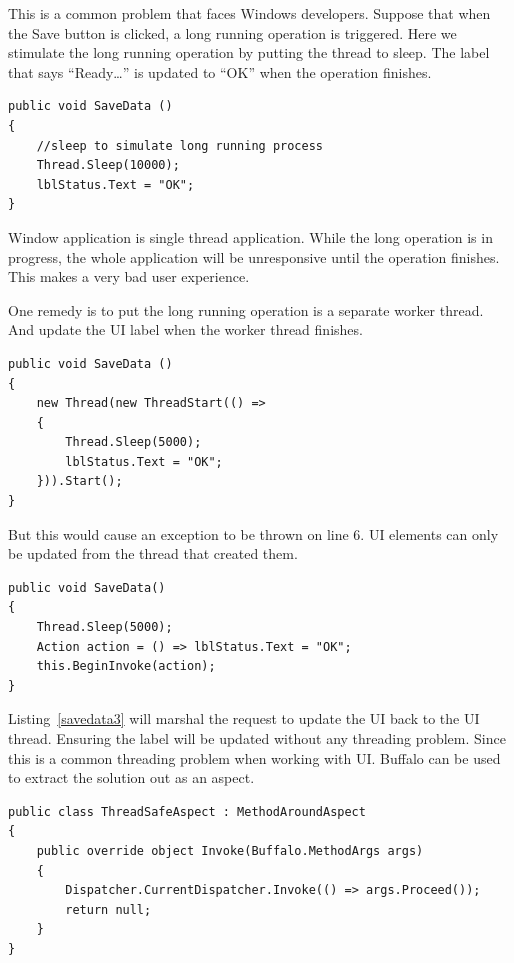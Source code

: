 This is a common problem that faces Windows developers. Suppose that when the Save button is clicked, a long running operation is triggered. Here we stimulate the long running operation by putting the thread to sleep. The label that says “Ready…” is updated to “OK” when the operation finishes.

\begin{lstlisting}[caption={Long running operation}, label=savedata1, frame=tb, basicstyle=\scriptsize]
public void SaveData ()
{
    //sleep to simulate long running process
    Thread.Sleep(10000);
    lblStatus.Text = "OK";
}
\end{lstlisting}

Window application is single thread application. While the long operation is in progress, the whole application will be unresponsive until the operation finishes. This makes a very bad user experience.

One remedy is to put the long running operation is a separate worker thread. And update the UI label when the worker thread finishes.

\begin{lstlisting}[caption={Long running operation with thread}, label=savedata2, frame=tb, basicstyle=\scriptsize]
public void SaveData ()
{
    new Thread(new ThreadStart(() =>
    {
        Thread.Sleep(5000);
        lblStatus.Text = "OK";
    })).Start();
}
\end{lstlisting}

But this would cause an exception to be thrown on line 6. UI elements can only be updated from the thread that created them.

\begin{lstlisting}[caption={Update UI from different thread}, label=savedata3, frame=tb, basicstyle=\scriptsize]
public void SaveData()
{ 
    Thread.Sleep(5000);
    Action action = () => lblStatus.Text = "OK";
    this.BeginInvoke(action);
}
\end{lstlisting}

Listing~\ref{savedata3} will marshal the request to update the UI back to the UI thread. Ensuring the label will be updated without any threading problem.
Since this is a common threading problem when working with UI. Buffalo can be used to extract the solution out as an aspect.

\begin{lstlisting}[caption={ThreadSafeAspect}, label=savedata4, frame=tb, basicstyle=\scriptsize]
public class ThreadSafeAspect : MethodAroundAspect
{
	public override object Invoke(Buffalo.MethodArgs args)
	{
		Dispatcher.CurrentDispatcher.Invoke(() => args.Proceed());
		return null;
	}
}
\end{lstlisting}

